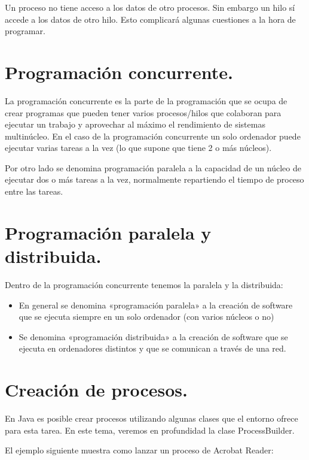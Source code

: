 \documentclass[letterpaper,10pt,spanish]{sphinxmanual}
\begin{document}
Un proceso no tiene acceso a los datos de otro procesos. Sin embargo un hilo sí accede a los datos de otro hilo. Esto complicará algunas cuestiones a la hora de programar.


\section{Programación concurrente.}
\label{\detokenize{textos/tema1:programacion-concurrente}}
La programación concurrente es la parte de la programación que se ocupa de crear programas que pueden tener varios procesos/hilos que colaboran para ejecutar un trabajo y aprovechar al máximo el rendimiento de sistemas multinúcleo. En el caso de la programación concurrente un solo ordenador puede ejecutar varias tareas a la vez (lo que supone que tiene 2 o más núcleos).

Por otro lado se denomina programación paralela a la capacidad de un núcleo de ejecutar dos o más tareas a la vez, normalmente repartiendo el tiempo de proceso entre las tareas.


\section{Programación paralela y distribuida.}
\label{\detokenize{textos/tema1:programacion-paralela-y-distribuida}}
Dentro de la programación concurrente tenemos la paralela y la distribuida:
\begin{itemize}
\item {} 
En general se denomina «programación paralela» a la creación de software que se ejecuta siempre en un solo ordenador (con varios núcleos o no)

\item {} 
Se denomina «programación distribuida» a la creación de software que se ejecuta en ordenadores distintos y que se comunican a través de una red.

\end{itemize}


\section{Creación de procesos.}
\label{\detokenize{textos/tema1:creacion-de-procesos}}
En Java es posible crear procesos utilizando algunas clases que el entorno ofrece para esta tarea. En este tema, veremos en profundidad la clase ProcessBuilder.

El ejemplo siguiente muestra como lanzar un proceso de Acrobat Reader:
\end{document}
